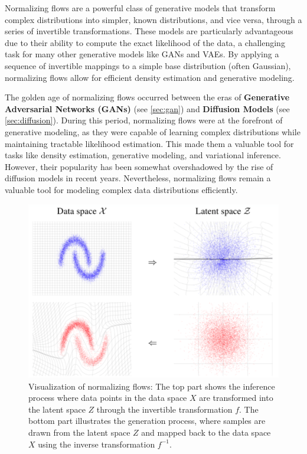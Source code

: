 \documentclass{article}
\begin{document}
Normalizing flows are a powerful class of generative models that transform complex distributions into simpler, known distributions, and vice versa, through a series of invertible transformations. These models are particularly advantageous due to their ability to compute the exact likelihood of the data, a challenging task for many other generative models like GANs and VAEs. By applying a sequence of invertible mappings to a simple base distribution (often Gaussian), normalizing flows allow for efficient density estimation and generative modeling. 

The golden age of normalizing flows occurred between the eras of \textbf{Generative Adversarial Networks (GANs)} (see \ref{sec:gan}) and \textbf{Diffusion Models} (see \ref{sec:diffusion}). During this period, normalizing flows were at the forefront of generative modeling, as they were capable of learning complex distributions while maintaining tractable likelihood estimation. This made them a valuable tool for tasks like density estimation, generative modeling, and variational inference. However, their popularity has been somewhat overshadowed by the rise of diffusion models in recent years. Nevertheless, normalizing flows remain a valuable tool for modeling complex data distributions efficiently.

\begin{figure}[ht]
    \centering
    \includegraphics[width=0.75\linewidth]{graphics/S9Flows/space_transformations.png}
    \caption{Visualization of normalizing flows: The top part shows the inference process where data points in the data space \(X\) are transformed into the latent space \(Z\) through the invertible transformation \(f\). The bottom part illustrates the generation process, where samples are drawn from the latent space \(Z\) and mapped back to the data space \(X\) using the inverse transformation \(f^{-1}\).}
    \label{fig:space-transformations}
\end{figure}
\end{document}
